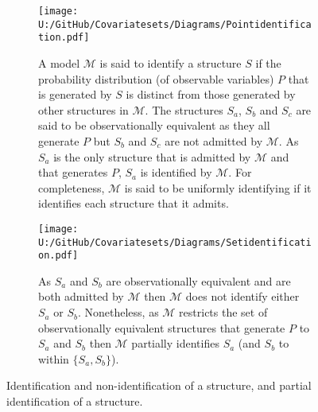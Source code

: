 \documentclass[10pt,a4paper,twoside]{article}
\numberwithin{equation}{section}
\begin{document}
\begin{figure}[p]
\centering
\begin{subfigure}{0.8\textwidth}
  \centering
  \texttt{[image: U:/GitHub/Covariatesets/Diagrams/Pointidentification.pdf]}
  \caption{A model $\mathcal{M}$ is said to identify a structure $S$ if the probability distribution (of observable variables) $P$ that is generated by $S$ is distinct from those generated by other structures in $\mathcal{M}$. The structures $S_a$, $S_b$ and $S_c$ are said to be observationally equivalent as they all generate $P$ but $S_b$ and $S_c$ are not admitted by $\mathcal{M}$. As $S_a$ is the only structure that is admitted by $\mathcal{M}$ and that generates $P$, $S_a$ is identified by $\mathcal{M}$. For completeness, $\mathcal{M}$ is said to be uniformly identifying if it identifies each structure that it admits.}
  \label{fig:identify}
  \end{subfigure}
  \begin{subfigure}{0.8\textwidth}
  \centering
  \texttt{[image: U:/GitHub/Covariatesets/Diagrams/Setidentification.pdf]}
  \caption{As $S_a$ and $S_b$ are observationally equivalent and are both admitted by $\mathcal{M}$ then $\mathcal{M}$ does not identify either $S_a$ or $S_b$. Nonetheless, as $\mathcal{M}$ restricts the set of observationally equivalent structures that generate $P$ to $S_a$ and $S_b$ then $\mathcal{M}$ partially identifies $S_a$ (and $S_b$ to within $\lbrace S_a,S_b\rbrace$).}
  \label{fig:partial}
  \end{subfigure}
\caption{Identification and non-identification of a structure, and partial identification of a structure.}
\label{fig:identification}
\end{figure}
\end{document}
